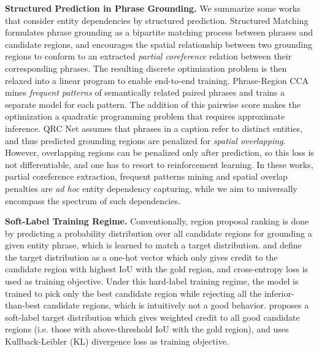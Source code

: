 \documentclass[11pt,a4paper]{article}
\newcommand{\smallsection}[1]{{\noindent\textbf{#1.}}}
\begin{document}
\smallsection{Structured Prediction in Phrase Grounding} We summarize some works that consider entity dependencies by structured prediction. Structured Matching \cite{DBLP:conf/eccv/WangAKMD16} formulates phrase grounding as a bipartite matching process between phrases and candidate regions, and encourages the spatial relationship between two grounding regions to conform to an extracted \emph{partial coreference} relation between their corresponding phrases. The resulting discrete optimization problem is then relaxed into a linear program to enable end-to-end training. Phrase-Region CCA \cite{DBLP:conf/iccv/PlummerMCHL17} mines \emph{frequent patterns} of semantically related paired phrases and trains a separate model for each pattern. The addition of this pairwise score makes the optimization a quadratic programming problem that requires approximate inference. QRC Net \cite{DBLP:conf/iccv/ChenKN17} assumes that phrases in a caption refer to distinct entities, and thus predicted grounding regions are penalized for \emph{spatial overlapping}. However, overlapping regions can be penalized only after prediction, so this loss is not differentiable, and one has to resort to reinforcement learning. In these works, partial coreference extraction, frequent patterns mining and spatial overlap penalties are \textit{ad hoc} entity dependency capturing, while we aim to universally encompass the spectrum of such dependencies. 

\smallsection{Soft-Label Training Regime} Conventionally, region proposal ranking is done by predicting a probability distribution over all candidate regions for grounding a given entity phrase, which is learned to match a target distribution. \citet{DBLP:conf/iccv/ChenKN17} and \citet{DBLP:conf/eccv/RohrbachRHDS16} define the target distribution as a one-hot vector which only gives credit to the candidate region with highest IoU with the gold region, and cross-entropy loss is used as training objective. Under this hard-label training regime, the model is trained to pick only the best candidate region while rejecting all the inferior-than-best candidate regions, which is intuitively not a good behavior. \citet{DBLP:conf/ijcai/YuYXZ0T18} proposes a soft-label target distribution which gives weighted credit to all good candidate regions (i.e. those with above-threshold IoU with the gold region), and uses Kullback-Leibler (KL) divergence loss as training objective. 
\end{document}
